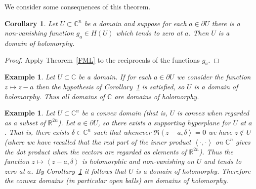\documentclass[11pt,a4paper, final, twoside]{article}
\newtheorem{corollary}[theorem]{Corollary}
\newtheorem{example}[theorem]{Example}
\numberwithin{equation}{section}
\newcommand{\C}{\mathbb C}
\newcommand{\R}{\mathbb R}
\newcommand{\bd}{\partial}
\newcommand{\hol}{H}
\renewcommand{\sp}[2]{\left<#1,#2\right>}
\begin{document}
We consider some consequences of this theorem.
\begin{corollary}
\label{mira}
Let $U\subset\C^n$ be a domain and suppose for each $a\in \bd U$ there is a non-vanishing function $g_a\in\hol(U)$ which tends to zero at $a$.
Then $U$ is a domain of holomorphy.
\end{corollary}
\begin{proof} Apply Theorem~\ref{FML} to the reciprocals of the functions $g_a$.
\end{proof}
\begin{example}
Let $U\subset\C$ be a domain. If for each $a\in\bd U$ we consider the function $z\mapsto z-a$ then the hypothesis of Corollary~\ref{mira} is satisfied, so $U$ is a domain of holomorphy.
Thus all domains of $\C$ are domains of holomorphy.
\end{example}
\begin{example}
Let $U\subset\C^n$ be a convex domain (that is, $U$ is convex when regarded as a subset of $\R^{2n}$).
Let $a\in\bd U$, so 
there exists a supporting hyperplane for $U$ at $a$. That is, there exists $\delta\in\C^n$ such that whenever $\Re\sp{z-a}{\delta}=0$ we have $z\not\in U$ (where we have recalled that the
real part of the inner product $\sp{\cdot}{\cdot}$ on $\C^n$ gives the dot product when the vectors are regarded as elements of $\R^{2n}$). Thus the function
$z\mapsto \sp{z-a}{\delta}$ is holomorphic and non-vanishing on $U$ and tends to zero at $a$. By Corollary~\ref{mira} it follows that $U$ is a domain of holomorphy.
Therefore the convex domains (in particular open balls) are domains of holomorphy.
\end{example}
\end{document}
